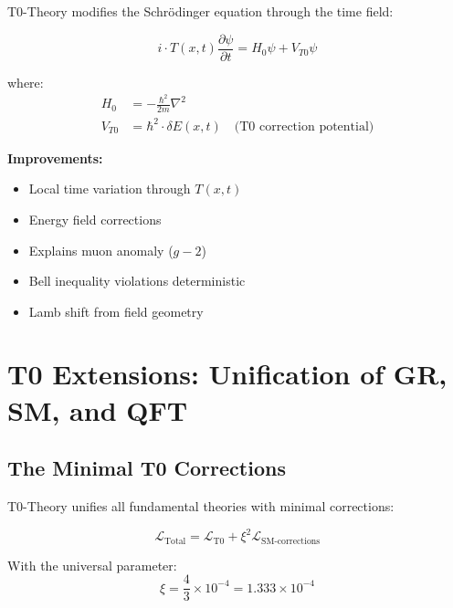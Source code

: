\documentclass[12pt,a4paper]{article}
\begin{document}
	T0-Theory modifies the Schrödinger equation through the time field:
	
	\begin{t0box}
		\begin{equation}
			i \cdot T(x,t) \frac{\partial\psi}{\partial t} = H_0 \psi + V_{T0} \psi
		\end{equation}
		
		where:
		\begin{align}
			H_0 &= -\frac{\hbar^2}{2m} \nabla^2 \\
			V_{T0} &= \hbar^2 \cdot \delta E(x,t) \quad \text{(T0 correction potential)}
		\end{align}
	\end{t0box}
	
	\textbf{Improvements:}
	\begin{itemize}
		\item Local time variation through $T(x,t)$
		\item Energy field corrections
		\item Explains muon anomaly ($g-2$)
		\item Bell inequality violations deterministic
		\item Lamb shift from field geometry
	\end{itemize}
	
	\section{T0 Extensions: Unification of GR, SM, and QFT}
	
	\subsection{The Minimal T0 Corrections}
	
	T0-Theory unifies all fundamental theories with minimal corrections:
	
	\begin{t0box}[T0 Unification]
		\begin{equation}
			\mathcal{L}_{\text{Total}} = \mathcal{L}_{\text{T0}} + \xi^2 \mathcal{L}_{\text{SM-corrections}}
		\end{equation}
		
		With the universal parameter:
		\begin{equation}
			\xi = \frac{4}{3} \times 10^{-4} = 1.333 \times 10^{-4}
		\end{equation}
	\end{t0box}
	
\end{document}
